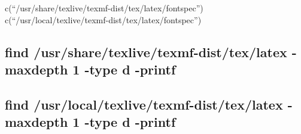 \documentclass[
]{article}
\newenvironment{Shaded}{\begin{snugshade}}{\end{snugshade}}
\newcommand{\AttributeTok}[1]{\textcolor[rgb]{0.13,0.29,0.53}{#1}}
\newcommand{\ConstantTok}[1]{\textcolor[rgb]{0.56,0.35,0.01}{#1}}
\newcommand{\ControlFlowTok}[1]{\textcolor[rgb]{0.13,0.29,0.53}{\textbf{#1}}}
\newcommand{\DecValTok}[1]{\textcolor[rgb]{0.00,0.00,0.81}{#1}}
\newcommand{\FunctionTok}[1]{\textcolor[rgb]{0.13,0.29,0.53}{\textbf{#1}}}
\newcommand{\NormalTok}[1]{#1}
\newcommand{\SpecialCharTok}[1]{\textcolor[rgb]{0.81,0.36,0.00}{\textbf{#1}}}
\newcommand{\StringTok}[1]{\textcolor[rgb]{0.31,0.60,0.02}{#1}}
\begin{document}
\begin{Shaded}
\end{Shaded}

c(``/usr/share/texlive/texmf-dist/tex/latex/fontspec'')
c(``/usr/local/texlive/texmf-dist/tex/latex/fontspec'')

\hypertarget{find-usrsharetexlivetexmf-disttexlatex--maxdepth-1--type-d--printf}{%
\subsection{find /usr/share/texlive/texmf-dist/tex/latex -maxdepth 1
-type d
-printf}\label{find-usrsharetexlivetexmf-disttexlatex--maxdepth-1--type-d--printf}}

\hypertarget{find-usrlocaltexlivetexmf-disttexlatex--maxdepth-1--type-d--printf}{%
\subsection{find /usr/local/texlive/texmf-dist/tex/latex -maxdepth 1
-type d
-printf}\label{find-usrlocaltexlivetexmf-disttexlatex--maxdepth-1--type-d--printf}}
\end{document}
